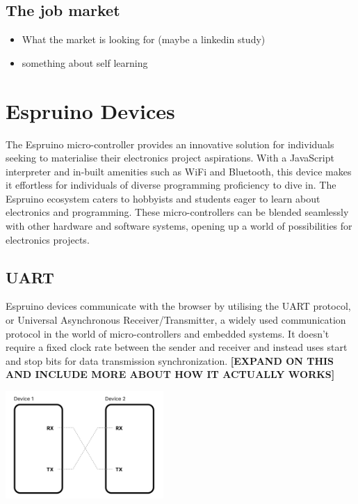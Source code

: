 \documentclass{l4proj}
\begin{document}
\subsection{The job market}
\begin{itemize}
    \item What the market is looking for (maybe a linkedin study)
    \item something about self learning
\end{itemize}

\section{Espruino Devices}
\text 
The Espruino micro-controller provides an innovative solution for individuals seeking to materialise their electronics project aspirations. With a JavaScript interpreter and in-built amenities such as WiFi and Bluetooth, this device makes it effortless for individuals of diverse programming proficiency to dive in. The Espruino ecosystem caters to hobbyists and students eager to learn about electronics and programming. These micro-controllers can be blended seamlessly with other hardware and software systems, opening up a world of possibilities for electronics projects.

    
\subsection{UART}
\text Espruino devices communicate with the browser by utilising the UART protocol, or Universal Asynchronous Receiver/Transmitter, a widely used communication protocol in the world of micro-controllers and embedded systems. It doesn't require a fixed clock rate between the sender and receiver and instead uses start and stop bits for data transmission synchronization. \textbf{[EXPAND ON THIS AND INCLUDE MORE ABOUT HOW IT ACTUALLY WORKS]}


\begin{center}
    \includegraphics[width=60mm,scale=0.5]{dissertation/images/UART_diagram.png}
\end{center}
\end{document}
